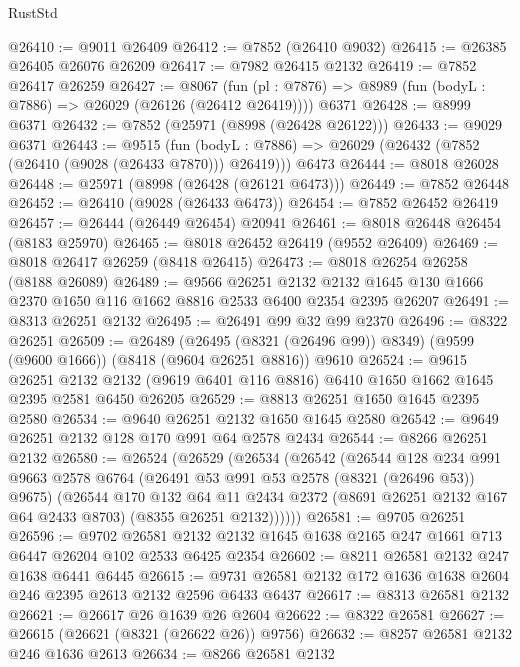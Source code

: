 \begin{lexlean}{RustStd}
\begin{coremodule}
@26410 := @9011 @26409
@26412 := @7852 (@26410 @9032)
@26415 := @26385 @26405 @26076 @26209
@26417 := @7982 @26415 @2132
@26419 := @7852 @26417 @26259
@26427 := @8067
    (fun (pl : @7876) => @8989 (fun (bodyL : @7886) => @26029 (@26126 (@26412 @26419))))
    @6371
@26428 := @8999 @6371
@26432 := @7852 (@25971 (@8998 (@26428 @26122)))
@26433 := @9029 @6371
@26443 := @9515
    (fun (bodyL : @7886) => @26029 (@26432 (@7852 (@26410 (@9028 (@26433 @7870))) @26419)))
    @6473
@26444 := @8018 @26028
@26448 := @25971 (@8998 (@26428 (@26121 @6473)))
@26449 := @7852 @26448
@26452 := @26410 (@9028 (@26433 @6473))
@26454 := @7852 @26452 @26419
@26457 := @26444 (@26449 @26454) @20941
@26461 := @8018 @26448 @26454 (@8183 @25970)
@26465 := @8018 @26452 @26419 (@9552 @26409)
@26469 := @8018 @26417 @26259 (@8418 @26415)
@26473 := @8018 @26254 @26258 (@8188 @26089)
@26489 := @9566
    @26251
    @2132
    @2132
    @1645
    @130
    @1666
    @2370
    @1650
    @116
    @1662
    @8816
    @2533
    @6400
    @2354
    @2395
    @26207
@26491 := @8313 @26251 @2132
@26495 := @26491 @99 @32 @99 @2370
@26496 := @8322 @26251
@26509 := @26489
    (@26495 (@8321 (@26496 @99)) @8349)
    (@9599 (@9600 @1666))
    (@8418 (@9604 @26251 @8816))
    @9610
@26524 := @9615
    @26251
    @2132
    @2132
    (@9619 @6401 @116 @8816)
    @6410
    @1650
    @1662
    @1645
    @2395
    @2581
    @6450
    @26205
@26529 := @8813 @26251 @1650 @1645 @2395 @2580
@26534 := @9640 @26251 @2132 @1650 @1645 @2580
@26542 := @9649 @26251 @2132 @128 @170 @991 @64 @2578 @2434
@26544 := @8266 @26251 @2132
@26580 := @26524
    (@26529
      (@26534
        (@26542
          (@26544
            @128
            @234
            @991
            @9663
            @2578
            @6764
            (@26491 @53 @991 @53 @2578 (@8321 (@26496 @53)) @9675)
            (@26544
              @170
              @132
              @64
              @11
              @2434
              @2372
              (@8691 @26251 @2132 @167 @64 @2433 @8703)
              (@8355 @26251 @2132))))))
@26581 := @9705 @26251
@26596 := @9702
    @26581
    @2132
    @2132
    @1645
    @1638
    @2165
    @247
    @1661
    @713
    @6447
    @26204
    @102
    @2533
    @6425
    @2354
@26602 := @8211 @26581 @2132 @247 @1638 @6441 @6445
@26615 := @9731 @26581 @2132 @172 @1636 @1638 @2604 @246 @2395 @2613 @2132 @2596 @6433 @6437
@26617 := @8313 @26581 @2132
@26621 := @26617 @26 @1639 @26 @2604
@26622 := @8322 @26581
@26627 := @26615 (@26621 (@8321 (@26622 @26)) @9756)
@26632 := @8257 @26581 @2132 @246 @1636 @2613
@26634 := @8266 @26581 @2132

\end{coremodule}
\end{lexlean}
